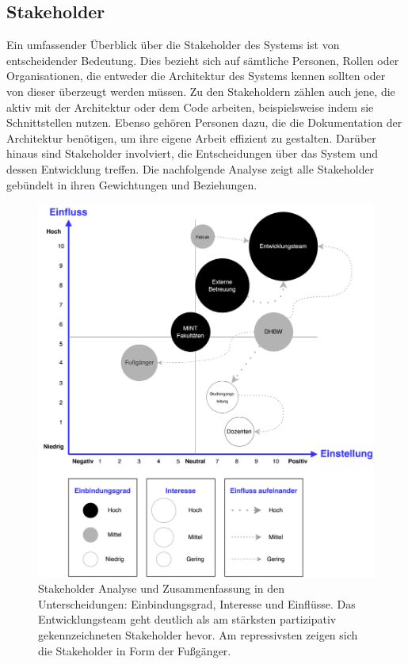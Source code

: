 \documentclass[
]{article}
\begin{document}
\hypertarget{_stakeholder}{%
\subsection{Stakeholder}\label{_stakeholder}}
Ein umfassender Überblick über die Stakeholder des Systems ist von entscheidender Bedeutung. Dies bezieht sich auf sämtliche Personen, Rollen oder Organisationen, die entweder die Architektur des Systems kennen sollten oder von dieser überzeugt werden müssen. Zu den Stakeholdern zählen auch jene, die aktiv mit der Architektur oder dem Code arbeiten, beispielsweise indem sie Schnittstellen nutzen. Ebenso gehören Personen dazu, die die Dokumentation der Architektur benötigen, um ihre eigene Arbeit effizient zu gestalten. Darüber hinaus sind Stakeholder involviert, die Entscheidungen über das System und dessen Entwicklung treffen.
Die nachfolgende Analyse zeigt alle Stakeholder gebündelt in ihren Gewichtungen und Beziehungen.  
\begin{figure}
  \centering
  \includegraphics[width=1\textwidth]{./resources/stakeholderanalyse.drawio.png}
  \caption{Stakeholder Analyse und Zusammenfassung in den Unterscheidungen: Einbindungsgrad, Interesse und Einflüsse. Das Entwicklungsteam geht deutlich als am stärksten partizipativ gekennzeichneten Stakeholder hevor. Am repressivsten zeigen sich die Stakeholder in Form der Fußgänger.}
  \label{fig:deine_label}
\end{figure}
\end{document}
